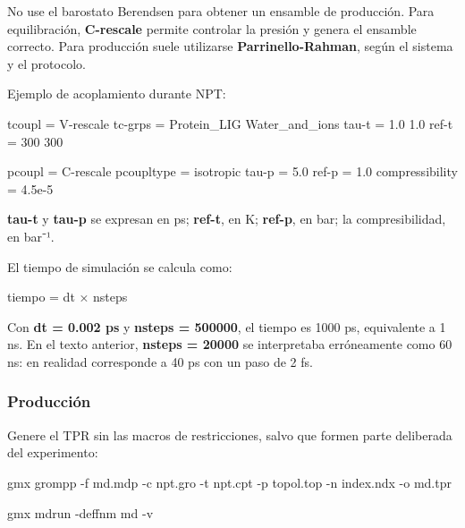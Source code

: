 \documentclass[
  spanish,
  11pt,
  a4paper]{article}
\newenvironment{Shaded}{\begin{snugshade}}{\end{snugshade}}
\newcommand{\AttributeTok}[1]{\textcolor[rgb]{0.13,0.29,0.53}{#1}}
\newcommand{\DataTypeTok}[1]{\textcolor[rgb]{0.13,0.29,0.53}{#1}}
\newcommand{\ExtensionTok}[1]{#1}
\newcommand{\FloatTok}[1]{\textcolor[rgb]{0.00,0.00,0.81}{#1}}
\newcommand{\NormalTok}[1]{#1}
\newcommand{\OtherTok}[1]{\textcolor[rgb]{0.56,0.35,0.01}{#1}}
\newcommand{\StringTok}[1]{\textcolor[rgb]{0.31,0.60,0.02}{#1}}
\begin{document}
No use el barostato Berendsen para obtener un ensamble de producción.
Para equilibración, \textbf{C-rescale} permite controlar la presión y
genera el ensamble correcto. Para producción suele utilizarse
\textbf{Parrinello-Rahman}, según el sistema y el protocolo.

Ejemplo de acoplamiento durante NPT:

\begin{Shaded}
\begin{Highlighting}[]
\DataTypeTok{tcoupl           }\OtherTok{=}\StringTok{ V{-}rescale}
\DataTypeTok{tc{-}grps          }\OtherTok{=}\StringTok{ Protein\_LIG Water\_and\_ions}
\DataTypeTok{tau{-}t            }\OtherTok{=}\StringTok{ 1.0 1.0}
\DataTypeTok{ref{-}t            }\OtherTok{=}\StringTok{ 300 300}

\DataTypeTok{pcoupl           }\OtherTok{=}\StringTok{ C{-}rescale}
\DataTypeTok{pcoupltype       }\OtherTok{=}\StringTok{ isotropic}
\DataTypeTok{tau{-}p            }\OtherTok{=}\StringTok{ }\FloatTok{5.0}
\DataTypeTok{ref{-}p            }\OtherTok{=}\StringTok{ }\FloatTok{1.0}
\DataTypeTok{compressibility  }\OtherTok{=}\StringTok{ 4.5e{-}5}
\end{Highlighting}
\end{Shaded}

\textbf{tau-t} y \textbf{tau-p} se expresan en ps; \textbf{ref-t}, en K;
\textbf{ref-p}, en bar; la compresibilidad, en bar⁻¹.

El tiempo de simulación se calcula como:

\begin{Shaded}
\begin{Highlighting}[]
\NormalTok{tiempo = dt × nsteps}
\end{Highlighting}
\end{Shaded}

Con \textbf{dt = 0.002 ps} y \textbf{nsteps = 500000}, el tiempo es 1000
ps, equivalente a 1 ns. En el texto anterior, \textbf{nsteps = 20000} se
interpretaba erróneamente como 60 ns: en realidad corresponde a 40 ps
con un paso de 2 fs.

\subsubsection{Producción}\label{producciuxf3n}

Genere el TPR sin las macros de restricciones, salvo que formen parte
deliberada del experimento:

\begin{Shaded}
\begin{Highlighting}[]
\ExtensionTok{gmx}\NormalTok{ grompp     }\AttributeTok{{-}f}\NormalTok{ md.mdp     }\AttributeTok{{-}c}\NormalTok{ npt.gro     }\AttributeTok{{-}t}\NormalTok{ npt.cpt     }\AttributeTok{{-}p}\NormalTok{ topol.top     }\AttributeTok{{-}n}\NormalTok{ index.ndx     }\AttributeTok{{-}o}\NormalTok{ md.tpr}

\ExtensionTok{gmx}\NormalTok{ mdrun }\AttributeTok{{-}deffnm}\NormalTok{ md }\AttributeTok{{-}v}
\end{Highlighting}
\end{Shaded}
\end{document}
